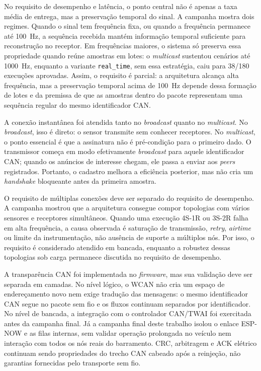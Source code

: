 No requisito de desempenho e latência, o ponto central não é apenas a taxa média
de entrega, mas a preservação temporal do sinal. A campanha mostra dois regimes.
Quando o sinal tem frequência fixa, ou quando a frequência permanece até 100~Hz,
a sequência recebida mantém informação temporal suficiente para reconstrução no
receptor. Em frequências maiores, o sistema só preserva essa propriedade quando
reúne amostras em lotes: o \emph{multicast} sustentou cenários até 1000~Hz,
enquanto a variante \texttt{real\_time}, sem essa estratégia, caiu para 38/180
execuções aprovadas. Assim, o requisito é parcial: a arquitetura alcança alta
frequência, mas a preservação temporal acima de 100~Hz depende dessa formação
de lotes e da premissa de que as amostras dentro do pacote representam uma
sequência regular do mesmo identificador CAN.

A conexão instantânea foi atendida tanto no \emph{broadcast} quanto no \emph{multicast}. No
\emph{broadcast}, isso é direto: o sensor transmite sem conhecer receptores. No
\emph{multicast}, o ponto essencial é que a assinatura não é pré-condição para o
primeiro dado. O transmissor começa em modo efetivamente \emph{broadcast} para aquele
identificador CAN; quando os anúncios de interesse chegam, ele passa a enviar aos \emph{peers}
registrados. Portanto, o cadastro melhora a eficiência posterior, mas não cria
um \emph{handshake} bloqueante antes da primeira amostra.

O requisito de múltiplas conexões deve ser separado do requisito de desempenho.
A campanha mostrou que a arquitetura consegue compor topologias com vários
sensores e receptores simultâneos. Quando uma execução 4S-1R ou 3S-2R falha em
alta frequência, a causa observada é saturação de transmissão, \emph{retry}, \emph{airtime} ou
limite da instrumentação, não ausência de suporte a múltiplos nós. Por isso, o
requisito é considerado atendido em bancada, enquanto a robustez dessas
topologias sob carga permanece discutida no requisito de desempenho.

A transparência CAN foi implementada no \emph{firmware}, mas sua validação deve ser
separada em camadas. No nível lógico, o WCAN não cria um espaço de endereçamento
novo nem exige tradução das mensagens: o mesmo identificador CAN segue no pacote sem fio e os
fluxos continuam separados por identificador. No nível de bancada, a integração com
o controlador CAN/TWAI foi exercitada antes da campanha final. Já a campanha final
deste trabalho isolou o enlace ESP-NOW e as filas internas, sem validar operação
prolongada no veículo nem interação com todos os nós reais do barramento. CRC,
arbitragem e ACK elétrico continuam sendo propriedades do trecho CAN cabeado após
a reinjeção, não garantias fornecidas pelo transporte sem fio.

